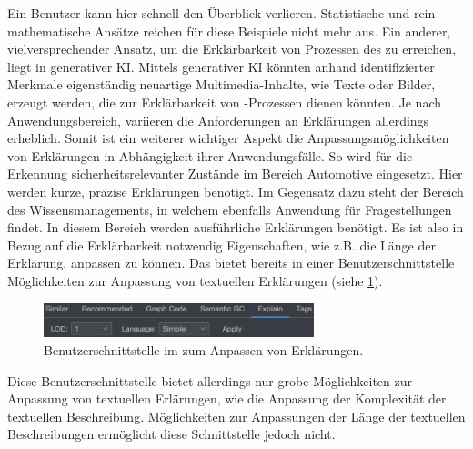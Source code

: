 Ein Benutzer kann hier schnell den Überblick verlieren.
\newline
Statistische und rein mathematische Ansätze reichen für diese Beispiele nicht mehr aus.
Ein anderer, vielversprechender Ansatz, um die Erklärbarkeit von Prozessen des \mmir{} zu erreichen, liegt in generativer KI.
\newline
Mittels generativer KI könnten anhand identifizierter Merkmale eigenständig neuartige Multimedia-Inhalte, wie Texte oder Bilder, erzeugt werden, die zur Erklärbarkeit von \mmir{}-Prozessen dienen könnten.
\newline
Je nach Anwendungsbereich, variieren die Anforderungen an Erklärungen allerdings erheblich.
Somit ist ein weiterer wichtiger Aspekt die Anpassungsmöglichkeiten von Erklärungen in Abhängigkeit ihrer Anwendungsfälle. 
So wird \smmir{} für die Erkennung sicherheitsrelevanter Zustände im Bereich Automotive eingesetzt. 
Hier werden kurze, präzise Erklärungen benötigt. 
Im Gegensatz dazu steht der Bereich des Wissensmanagements, in welchem \smmir{} ebenfalls Anwendung für Fragestellungen findet.
In diesem Bereich werden ausführliche Erklärungen benötigt.
Es ist also in Bezug auf die Erklärbarkeit notwendig Eigenschaften, wie z.B. die Länge der Erklärung, anpassen zu können.
\newline
Das \gmaf{} bietet bereits in einer Benutzerschnittstelle Möglichkeiten zur Anpassung von textuellen Erklärungen (siehe \cref{explain-ui}).
\begin{figure}[htb]
    \centering
    \includegraphics[width=0.7\textwidth]{resources/images/explain-ui.png}
    \caption{Benutzerschnittstelle im \gmaf{} zum Anpassen von Erklärungen.}
    \label{explain-ui}
\end{figure}
\noindent
Diese Benutzerschnittstelle bietet allerdings nur grobe Möglichkeiten zur Anpassung von textuellen Erlärungen, wie die Anpassung der Komplexität der textuellen Beschreibung.
Möglichkeiten zur Anpassungen der Länge der textuellen Beschreibungen ermöglicht diese Schnittstelle jedoch nicht.

